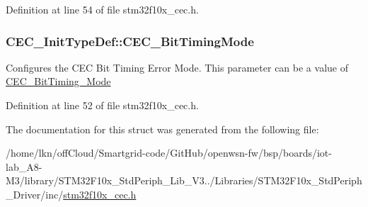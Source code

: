 Definition at line 54 of file stm32f10x\+\_\+cec.\+h.

\subsubsection[{\texorpdfstring{C\+E\+C\+\_\+\+Bit\+Timing\+Mode}{CEC_BitTimingMode}}]{ C\+E\+C\+\_\+\+Init\+Type\+Def\+::\+C\+E\+C\+\_\+\+Bit\+Timing\+Mode}\hypertarget{struct_c_e_c___init_type_def_a197bc5a8957ab0b86d4ecc1347fa9e37}{}\label{struct_c_e_c___init_type_def_a197bc5a8957ab0b86d4ecc1347fa9e37}
Configures the C\+EC Bit Timing Error Mode. This parameter can be a value of \hyperlink{group___c_e_c___bit_timing___mode}{C\+E\+C\+\_\+\+Bit\+Timing\+\_\+\+Mode} 

Definition at line 52 of file stm32f10x\+\_\+cec.\+h.



The documentation for this struct was generated from the following file\+:\begin{DoxyCompactItemize}
\item 
/home/lkn/off\+Cloud/\+Smartgrid-\/code/\+Git\+Hub/openwsn-\/fw/bsp/boards/iot-\/lab\+\_\+\+A8-\/\+M3/library/\+S\+T\+M32\+F10x\+\_\+\+Std\+Periph\+\_\+\+Lib\+\_\+\+V3../\+Libraries/\+S\+T\+M32\+F10x\+\_\+\+Std\+Periph\+\_\+\+Driver/inc/\hyperlink{iot-lab___a8-_m3_2library_2_s_t_m32_f10x___std_periph___lib___v3_85_80_2_libraries_2_s_t_m32_f1049e339e0f7aefc0402b456e990d1bb27}{stm32f10x\+\_\+cec.\+h}\end{DoxyCompactItemize}
